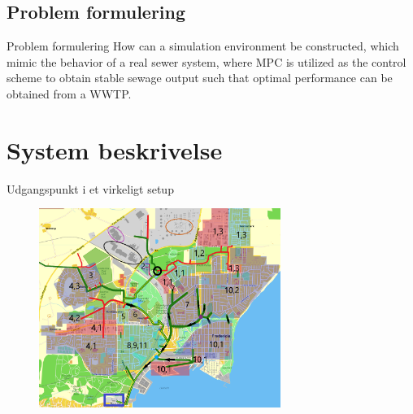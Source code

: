 


\subsection{Problem formulering}

\begin{frame}{Problem formulering}{}
\vfill\vfill\centering
How can a simulation environment be constructed, which mimic the behavior of a real
sewer system, where MPC is utilized as the control scheme to obtain stable sewage output
such that optimal performance can be obtained from a WWTP.
\vfill\vfill
\end{frame}

\section{System beskrivelse} %


\begin{frame}{Udgangspunkt i et virkeligt setup}{}
\begin{figure}[H]
\centering
\includegraphics[width=0.7\textwidth]{Sections/pictures/kloakgrid_simplified10.png}
\end{figure}
\end{frame}

